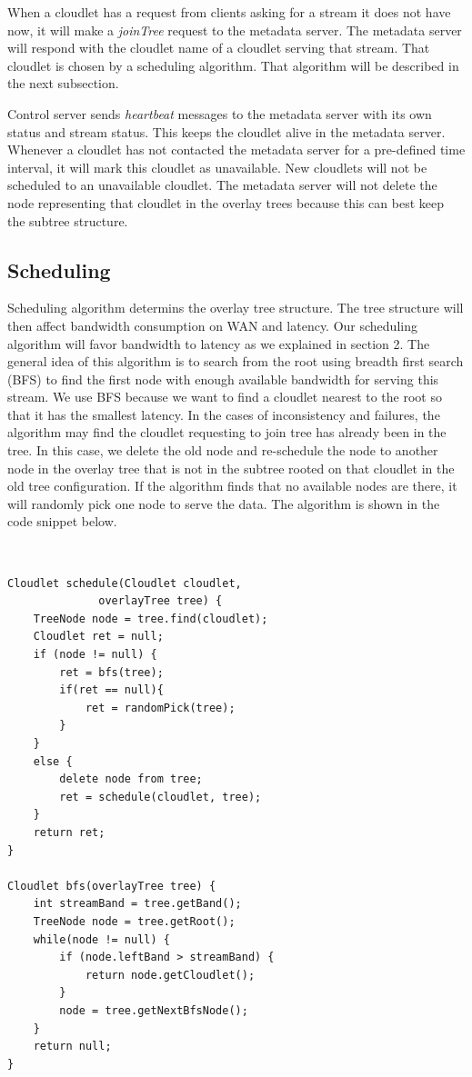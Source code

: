 \documentclass[letterpaper,twocolumn,10pt]{article}
\begin{document}
When a cloudlet has a request from clients asking for a stream it does not have now, it will make a \emph{joinTree} request to the metadata server. The metadata server will respond with the cloudlet name of a cloudlet serving that stream. That cloudlet is chosen by a scheduling algorithm. That algorithm will be described in the next subsection. 

Control server sends \emph{heartbeat} messages to the metadata server with its own status and stream status. This keeps the cloudlet alive in the metadata server. Whenever a cloudlet has not contacted the metadata server for a pre-defined time interval, it will mark this cloudlet as unavailable. New cloudlets will not be scheduled to an unavailable cloudlet. The metadata server will not delete the node representing that cloudlet in the overlay trees because this can best keep the subtree structure. 

\subsection{Scheduling}
Scheduling algorithm determins the overlay tree structure. The tree structure will then affect bandwidth consumption on WAN and latency. Our scheduling algorithm will favor bandwidth to latency as we explained in section 2. The general idea of this algorithm is to search from the root using breadth first search (BFS) to find the first node with enough available bandwidth for serving this stream. We use BFS because we want to find a cloudlet nearest to the root so that it has the smallest latency. In the cases of inconsistency and failures, the algorithm may find the cloudlet requesting to join tree has already been in the tree. In this case, we delete the old node and re-schedule the node to another node in the overlay tree that is not in the subtree rooted on that cloudlet in the old tree configuration. If the algorithm finds that no available nodes are there, it will randomly pick one node to serve the data. The algorithm is shown in the code snippet below. 

{\tt \small
\begin{verbatim}
Cloudlet schedule(Cloudlet cloudlet,
              overlayTree tree) {
    TreeNode node = tree.find(cloudlet);
    Cloudlet ret = null;
    if (node != null) {
        ret = bfs(tree);
        if(ret == null){
            ret = randomPick(tree);
        }
    } 
    else {
        delete node from tree;
        ret = schedule(cloudlet, tree);
    }
    return ret;
}

Cloudlet bfs(overlayTree tree) {
    int streamBand = tree.getBand();
    TreeNode node = tree.getRoot();
    while(node != null) {
        if (node.leftBand > streamBand) {
            return node.getCloudlet();
        }
        node = tree.getNextBfsNode();
    } 
    return null;
}

\end{verbatim}
}
\end{document}
